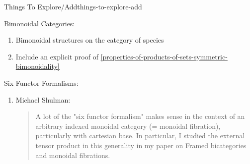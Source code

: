 \begin{remark}{Things To Explore/Add}{things-to-explore-add}
\begin{enumerate}
    \end{enumerate}
    Bimonoidal Categories:
    \begin{enumerate}
        \item Bimonoidal structures on the category of species
        \item Include an explicit proof of \cref{properties-of-products-of-sets-symmetric-bimonoidality}
    \end{enumerate}
    Six Functor Formalisms:
    \begin{enumerate}
        \item Michael Shulman: 
            \begin{quote}
                A lot of the "six functor formalism" makes sense in the context of an arbitrary indexed monoidal category (= monoidal fibration), particularly with cartesian base. In particular, I studied the external tensor product in this generality in my paper on Framed bicategories and monoidal fibrations.


\end{quote}
\end{enumerate}
\end{remark}
